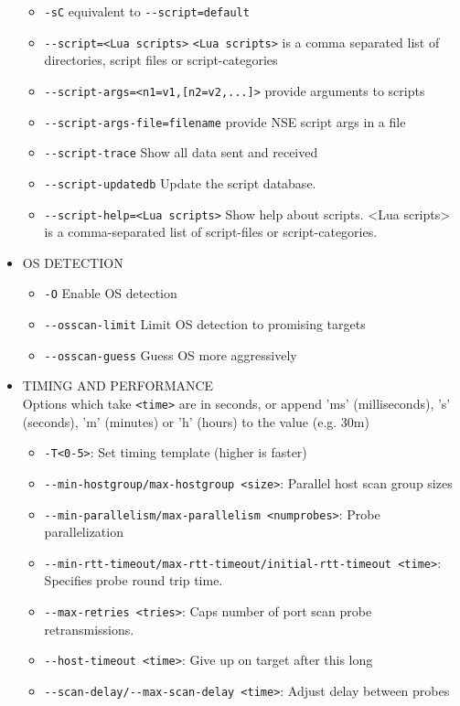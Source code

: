 \begin{itemize}
\begin{itemize}
        \item \verb|-sC| equivalent to \verb|--script=default|
        \item \verb|--script=<Lua scripts>| \verb|<Lua scripts>| is a comma separated list of directories, script files or script-categories
        \item \verb|--script-args=<n1=v1,[n2=v2,...]>| provide arguments to scripts
        \item \verb|--script-args-file=filename| provide NSE script args in a file
        \item \verb|--script-trace| Show all data sent and received
        \item \verb|--script-updatedb| Update the script database.
        \item \verb|--script-help=<Lua scripts>| Show help about scripts. <Lua scripts> is a comma-separated list of script-files or script-categories.
    \end{itemize}
    \item OS DETECTION
    \begin{itemize}
        \item \verb|-O| Enable OS detection
        \item \verb|--osscan-limit| Limit OS detection to promising targets
        \item \verb|--osscan-guess| Guess OS more aggressively
    \end{itemize}
    \item TIMING AND PERFORMANCE\\
    Options which take \verb|<time>| are in seconds, or append 'ms' (milliseconds), 's' (seconds), 'm' (minutes) or 'h' (hours) to the value (e.g. 30m)
    \begin{itemize}
        \item \verb|-T<0-5>|: Set timing template (higher is faster)
        \item \verb|--min-hostgroup/max-hostgroup <size>|: Parallel host scan group sizes
        \item \verb|--min-parallelism/max-parallelism <numprobes>|: Probe parallelization
        \item \verb|--min-rtt-timeout/max-rtt-timeout/initial-rtt-timeout <time>|: Specifies probe round trip time.
        \item \verb|--max-retries <tries>|: Caps number of port scan probe retransmissions.
        \item \verb|--host-timeout <time>|: Give up on target after this long
        \item \verb|--scan-delay/--max-scan-delay <time>|: Adjust delay between probes

\end{itemize}
\end{itemize}
